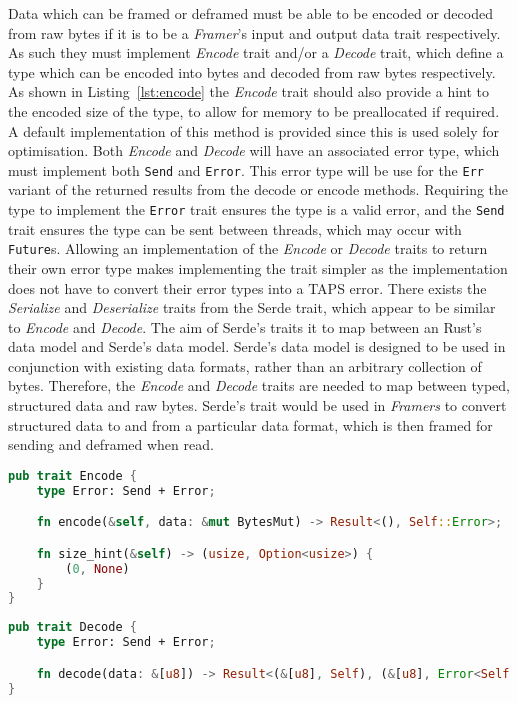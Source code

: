 Data which can be framed or deframed must be able to be encoded or decoded from raw bytes if it is to be a
\emph{Framer}'s input and output data trait respectively.
As such they must implement \emph{Encode} trait and/or a \emph{Decode} trait, which define a type which can be encoded
into bytes and decoded from raw bytes respectively.
As shown in Listing~\ref{lst:encode} the \emph{Encode} trait should also provide a hint to the encoded size of the type,
to allow for memory to be preallocated if required.
A default implementation of this method is provided since this is used solely for optimisation.
Both \emph{Encode} and \emph{Decode} will have an associated error type, which must implement both \texttt{Send} and
\texttt{Error}.
This error type will be use for the \texttt{Err} variant of the returned results from the decode or encode methods.
Requiring the type to implement the \texttt{Error} trait ensures the type is a valid error, and the \texttt{Send} trait
ensures the type can be sent between threads, which may occur with \texttt{Future}s.
Allowing an implementation of the \emph{Encode} or \emph{Decode} traits to return their own error type makes
implementing the trait simpler as the implementation does not have to convert their error types into a TAPS error.
There exists the \emph{Serialize} and \emph{Deserialize} traits from the Serde trait, which appear to be similar to
\emph{Encode} and \emph{Decode}.
The aim of Serde's traits it to map between an Rust's data model and Serde's data model.
Serde's data model is designed to be used in conjunction with existing data formats, rather than an arbitrary collection
of bytes.
Therefore, the \emph{Encode} and \emph{Decode} traits are needed to map between typed, structured data and raw bytes.
Serde's trait would be used in \emph{Framers} to convert structured data to and from a particular data format, which is
then framed for sending and deframed when read.

\begin{lstlisting}[language=Rust, float=h, label=lst:encode, caption={The Encode trait, showing the size\_hint method.}]
pub trait Encode {
    type Error: Send + Error;

    fn encode(&self, data: &mut BytesMut) -> Result<(), Self::Error>;

    fn size_hint(&self) -> (usize, Option<usize>) {
        (0, None)
    }
}
\end{lstlisting}

\begin{lstlisting}[language=Rust, float=h, label=lst:decode, caption={The Decode trait.}]
pub trait Decode {
    type Error: Send + Error;

    fn decode(data: &[u8]) -> Result<(&[u8], Self), (&[u8], Error<Self::Error>)>;
}
\end{lstlisting}

